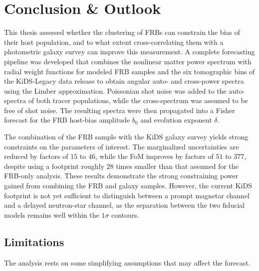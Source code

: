 \chapter{Conclusion \& Outlook} \label{ch:conclusion}
This thesis assessed whether the clustering of FRBs can constrain the bias of their
host population, and to what extent cross-correlating them with a photometric galaxy survey can improve this measurement.
A complete forecasting pipeline was developed that combines the nonlinear matter power spectrum with radial 
weight functions for modeled FRB samples and the six tomographic bins of the KiDS-Legacy data release to 
obtain angular auto- and cross-power spectra using the Limber approximation.
Poissonian shot noise was added to the auto-spectra of both tracer populations, 
while the cross-spectrum was assumed to be free of shot noise. The resulting spectra were then 
propagated into a Fisher forecast for the FRB host-bias amplitude $b_0$ and evolution exponent $\delta$.

The combination of the FRB sample with the KiDS galaxy survey yields strong constraints on the 
parameters of interest. The marginalized uncertainties are reduced by factors of $15$ to $46$, while 
the FoM improves by factors of $51$ to $377$, despite using a footprint roughly $28$ 
times smaller than that assumed for the FRB-only analysis. These results demonstrate the strong 
constraining power gained from combining the FRB and galaxy samples. However, the current KiDS 
footprint is not yet sufficient to distinguish between a prompt magnetar channel and a delayed 
neutron-star channel, as the separation between the two fiducial models remains well within 
the $1\sigma$ contours.

\section{Limitations} \label{sec:limitations}
The analysis rests on some simplifying assumptions that may affect the forecast.

